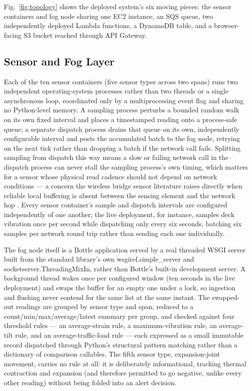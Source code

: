 \documentclass[conference]{IEEEtran}
\begin{document}
Fig.~\ref{fig:topology} shows the deployed system's six moving pieces: the sensor containers and fog node sharing one EC2 instance, an SQS queue, two independently deployed Lambda functions, a DynamoDB table, and a browser-facing S3 bucket reached through API Gateway.

\subsection{Sensor and Fog Layer}

Each of the ten sensor containers (five sensor types across two spans) runs two independent operating-system processes rather than two threads or a single asynchronous loop, coordinated only by a multiprocessing event flag and sharing no Python-level memory. A sampling process perturbs a bounded random walk on its own fixed interval and places a timestamped reading onto a process-safe queue; a separate dispatch process drains that queue on its own, independently configurable interval and posts the accumulated batch to the fog node, retrying on the next tick rather than dropping a batch if the network call fails. Splitting sampling from dispatch this way means a slow or failing network call in the dispatch process can never stall the sampling process's own timing, which matters for a sensor whose physical read cadence should not depend on network conditions --- a concern the wireless bridge sensor literature raises directly when reliable local buffering is absent between the sensing element and the network hop \cite{ref2}. Every sensor container's sample and dispatch intervals are configured independently of one another; the live deployment, for instance, samples deck vibration once per second while dispatching only every six seconds, batching six samples per network round trip rather than sending each one individually.

The fog node itself is a Bottle application served by a real threaded WSGI server built from the standard library's own wsgiref.simple\_server and socketserver.ThreadingMixIn, rather than Bottle's built-in development server. A background thread wakes once per configured window (ten seconds in the live deployment) and swaps the buffer for an empty one under a lock, so ingestion and flushing never contend for the same list at the same instant. The swapped-out readings are grouped by sensor type and span, reduced to a count/min/max/average/latest summary per group, and checked against four threshold rules --- an average-strain rule, a maximum-vibration rule, an average-tilt rule, and an average-traffic-load rule --- each expressed as a small immutable record dispatched through Python's structural pattern matching rather than a dictionary of comparison callables. The fifth sensor type, expansion-joint movement, carries no rule at all: it is deliberately informational, tracking thermal contraction and expansion (and therefore permitted to go negative, unlike every other reading) without being folded into an alert decision.
\end{document}

